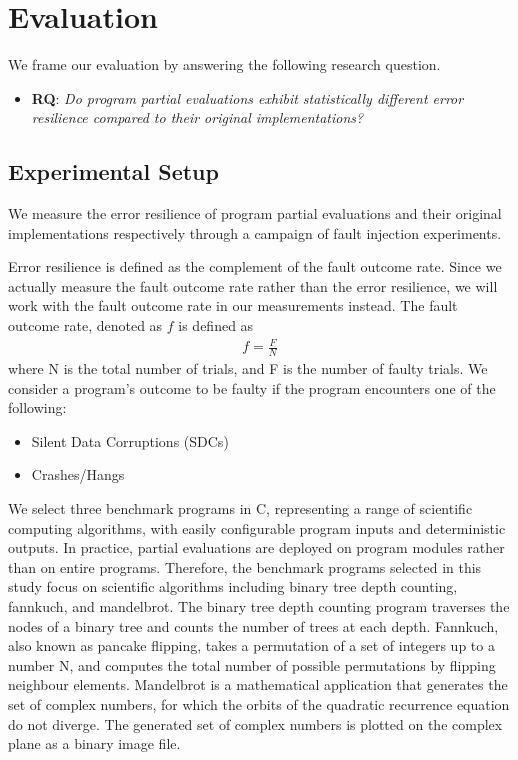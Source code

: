 \section{Evaluation}
\label{sec:evaluation}

We frame our evaluation by answering the following research question. 

\begin{itemize}
\item {\bf RQ}: \textit{Do program partial evaluations exhibit statistically different error resilience compared to their original implementations?}
\end{itemize}

\subsection{Experimental Setup}
\label{sec:exp.setup}

We measure the error resilience of program partial evaluations and their original implementations respectively through a campaign of fault injection experiments. 

Error resilience is defined as the complement of the fault outcome rate.
Since we actually measure the fault outcome rate rather than the error resilience, we will work with the fault outcome rate in our measurements instead.
The fault outcome rate, denoted as $f$ is defined as 
\begin{align*}
f = \frac{F}{N}
\end{align*}
where N is the total number of trials, and F is the number of faulty trials.
We consider a program's outcome to be faulty if the program encounters one of the following:
\begin{itemize}
\item Silent Data Corruptions (SDCs) 
\item Crashes/Hangs
\end{itemize}

\bigbreak

We select three benchmark programs in C, representing a range of scientific computing algorithms, with easily configurable program inputs and deterministic outputs.
In practice, partial evaluations are deployed on program modules rather than on entire programs. 
Therefore, the benchmark programs selected in this study focus on scientific algorithms including binary tree depth counting, fannkuch, and mandelbrot.
The binary tree depth counting program traverses the nodes of a binary tree and counts the number of trees at each depth.
Fannkuch, also known as pancake flipping, takes a permutation of a set of integers up to a number N, and computes the total number of possible permutations by flipping neighbour elements.
Mandelbrot is a mathematical application that generates the set of complex numbers, for which the orbits of the quadratic recurrence equation do not diverge.
The generated set of complex numbers is plotted on the complex plane as a binary image file.

